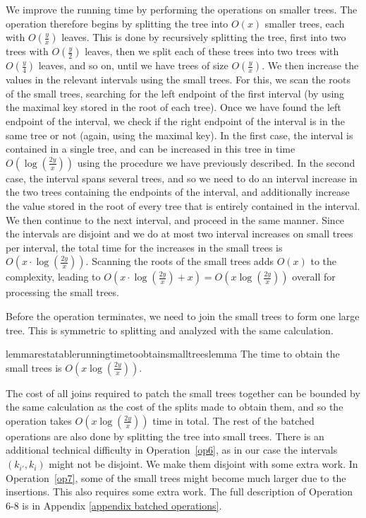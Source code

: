 \documentclass[a4paper,UKenglish]{lipics-v2016}
\theoremstyle{plain}
\begin{document}
We improve the running time by performing the operations on smaller trees. The operation therefore begins by splitting the tree into $O(x)$ smaller trees, each with $O(\frac{y}{x})$ leaves. This is done by recursively splitting the tree, first into two trees with $O(\frac{y}{2})$ leaves, then we split each of these trees into two trees with $O(\frac{y}{4})$ leaves, and so on, until we have trees of size $O(\frac{y}{x})$. We then increase the values in the relevant intervals using the small trees. For this, we scan the roots of the small trees, searching for the left endpoint of the first interval (by using the maximal key stored in the root of each tree). Once we have found the left endpoint of the interval, we check if the right endpoint of the interval is in the same tree or not (again, using the maximal key). In the first case, the interval is contained in a single tree, and can be increased in this tree in time $O(\log(\frac{2y}{x}))$ using the procedure we have previously described. In the second case, the interval spans several trees, and so we need to do an interval increase in the two trees containing the endpoints of the interval, and additionally increase the value stored in the root of every tree that is entirely contained in the interval. We then continue to the next interval, and proceed in the same manner. 
%
Since the intervals are disjoint and we do at most two interval increases on small trees per interval, the total time for the increases in the small trees is $O(x \cdot \log (\frac{2y}{x}))$. Scanning the roots of the small trees adds $O(x)$ to the complexity, leading to 
 $O(x \cdot \log (\frac{2y}{x}) + x) = O(x \log (\frac{2y}{x}))$ overall for processing the small trees.

Before the operation terminates, we need to join the small trees to form one large tree. This is symmetric to splitting and analyzed with the same
calculation.
\begin{restatable}{lemmarestatable}{runningtimetoobtainsmalltreeslemma}
\label{running time to obtain small trees lemma}
The time to obtain the small trees is $O(x \log (\frac{2y}{x}))$.
\end{restatable}

The cost of all joins required to patch the small trees together can be bounded by the same calculation as the cost of the splits made to obtain them, and so the operation takes $O(x \log (\frac{2y}{x}))$ time in total.
The rest of the batched operations are also done by splitting the tree into small trees. 
There is an additional technical difficulty in Operation~\ref{op6}, as in our case the intervals $(k_{i'},k_{i})$ might not be disjoint. We make them disjoint with some extra work. 
In Operation~\ref{op7}, some of the small trees might become much larger due to the insertions. This also requires some extra work.
The full description of Operation 6-8 is in Appendix \ref{appendix batched operations}.
\end{document}
